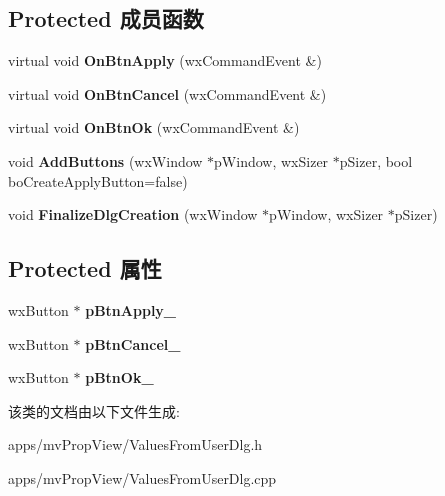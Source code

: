 \subsection*{Protected 成员函数}
\begin{DoxyCompactItemize}
\item 
\hypertarget{class_ok_and_cancel_dlg_a96e86956442fdeee069ac853deecc3da}{virtual void {\bfseries On\+Btn\+Apply} (wx\+Command\+Event \&)}\label{class_ok_and_cancel_dlg_a96e86956442fdeee069ac853deecc3da}

\item 
\hypertarget{class_ok_and_cancel_dlg_a067f7b07e54ef3f896e671a1cc0ae8b6}{virtual void {\bfseries On\+Btn\+Cancel} (wx\+Command\+Event \&)}\label{class_ok_and_cancel_dlg_a067f7b07e54ef3f896e671a1cc0ae8b6}

\item 
\hypertarget{class_ok_and_cancel_dlg_a96c791320fbdeaea9ccf669fb424eaf3}{virtual void {\bfseries On\+Btn\+Ok} (wx\+Command\+Event \&)}\label{class_ok_and_cancel_dlg_a96c791320fbdeaea9ccf669fb424eaf3}

\item 
\hypertarget{class_ok_and_cancel_dlg_a7dea2c73f131d74c35db414ee758c079}{void {\bfseries Add\+Buttons} (wx\+Window $\ast$p\+Window, wx\+Sizer $\ast$p\+Sizer, bool bo\+Create\+Apply\+Button=false)}\label{class_ok_and_cancel_dlg_a7dea2c73f131d74c35db414ee758c079}

\item 
\hypertarget{class_ok_and_cancel_dlg_aec465f9d2c615c40d5d0bd3fb264d298}{void {\bfseries Finalize\+Dlg\+Creation} (wx\+Window $\ast$p\+Window, wx\+Sizer $\ast$p\+Sizer)}\label{class_ok_and_cancel_dlg_aec465f9d2c615c40d5d0bd3fb264d298}

\end{DoxyCompactItemize}
\subsection*{Protected 属性}
\begin{DoxyCompactItemize}
\item 
\hypertarget{class_ok_and_cancel_dlg_ac4f269cecf2a5abda946d98941bbff1d}{wx\+Button $\ast$ {\bfseries p\+Btn\+Apply\+\_\+}}\label{class_ok_and_cancel_dlg_ac4f269cecf2a5abda946d98941bbff1d}

\item 
\hypertarget{class_ok_and_cancel_dlg_a67c4a6fb1c488f13ab0b4506a0303437}{wx\+Button $\ast$ {\bfseries p\+Btn\+Cancel\+\_\+}}\label{class_ok_and_cancel_dlg_a67c4a6fb1c488f13ab0b4506a0303437}

\item 
\hypertarget{class_ok_and_cancel_dlg_ad0928214f9fd0310c4f3f1ee6f73a550}{wx\+Button $\ast$ {\bfseries p\+Btn\+Ok\+\_\+}}\label{class_ok_and_cancel_dlg_ad0928214f9fd0310c4f3f1ee6f73a550}

\end{DoxyCompactItemize}


该类的文档由以下文件生成\+:\begin{DoxyCompactItemize}
\item 
apps/mv\+Prop\+View/Values\+From\+User\+Dlg.\+h\item 
apps/mv\+Prop\+View/Values\+From\+User\+Dlg.\+cpp\end{DoxyCompactItemize}
